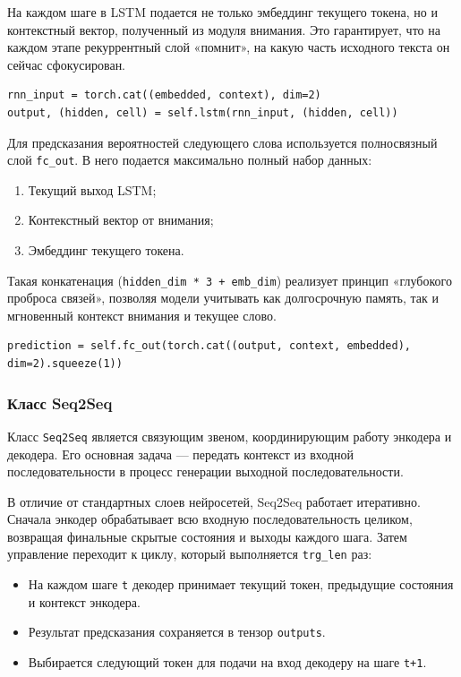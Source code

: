 \documentclass[coursework]{SCWorks}
\begin{document}
    На каждом шаге в LSTM подается не только эмбеддинг текущего токена, но и контекстный вектор, полученный из модуля внимания.
    Это гарантирует, что на каждом этапе рекуррентный слой «помнит», на какую часть исходного текста он сейчас сфокусирован.

    \begin{verbatim}
rnn_input = torch.cat((embedded, context), dim=2)
output, (hidden, cell) = self.lstm(rnn_input, (hidden, cell))
    \end{verbatim}

    Для предсказания вероятностей следующего слова используется полносвязный слой \texttt{fc\_out}.
    В него подается максимально полный набор данных:
    \begin{enumerate}
        \item Текущий выход LSTM;
        \item Контекстный вектор от внимания;
        \item Эмбеддинг текущего токена.
    \end{enumerate}

    Такая конкатенация (\texttt{hidden\_dim * 3 + emb\_dim}) реализует принцип «глубокого проброса связей»,
    позволяя модели учитывать как долгосрочную память, так и мгновенный контекст внимания и текущее слово.

    \begin{verbatim}
prediction = self.fc_out(torch.cat((output, context, embedded), dim=2).squeeze(1))
    \end{verbatim}

    \subsubsection{Класс Seq2Seq}

    Класс \texttt{Seq2Seq} является связующим звеном, координирующим работу энкодера и декодера.
    Его основная задача — передать контекст из входной последовательности
    в процесс генерации выходной последовательности.

    В отличие от стандартных слоев нейросетей, Seq2Seq работает итеративно.
    Сначала энкодер обрабатывает всю входную последовательность целиком, возвращая финальные скрытые состояния и выходы каждого шага.
    Затем управление переходит к циклу, который выполняется \texttt{trg\_len} раз:
    \begin{itemize}
        \item На каждом шаге \texttt{t} декодер принимает текущий токен, предыдущие состояния и контекст энкодера.
        \item Результат предсказания сохраняется в тензор \texttt{outputs}.
        \item Выбирается следующий токен для подачи на вход декодеру на шаге \texttt{t+1}.
    \end{itemize}
\end{document}

